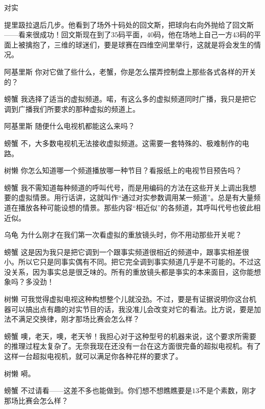 \begin{dialog}{对实}
\begin{dialogue}
提里趿拉退后几步。他看到了场外十码处的回文斯，把球向右向外抛给了回文斯——看来很成功！回文斯现在到了$35$码平面，$40$码，他在场地上自己一方$43$码的平面上被擒抱了，三维的球迷们，要是球赛在四维空间里举行，这就是将会发生的情况。

\item[阿基里斯]你对它做了些什么，老蟹，你是怎么摆弄控制盘上那些各式各样的开关的？

\item[螃蟹]我选择了适当的虚拟频道。喏，有这么多的虚拟频道同时广播，我只是把它调到广播我们所要求的那种虚拟的频道上。

\item[阿基里斯]随便什么电视机都能这么来吗？

\item[螃蟹]不，大多数电视机无法接收虚拟频道。这需要一套特殊的、极难制作的电路。

\item[树懒]你怎么知道哪一个频道播放哪一种节目？看报纸上的电视节目预告吗？

\item[螃蟹]我不需知道每种频道的呼叫代号，而是用编码的方法在这些开关上调出我想要的虚拟情景。用行话讲，这就叫作“通过对实参数调用某一频道”。总是有大量频道在播放各种可能设想的情景。那些内容“相近似”的各频道，其呼叫代号也彼此相近似。

\item[乌龟]为什么刚才在我们第一次看虚拟的重放镜头时，你不用动那些开关呢？

\item[螃蟹]这是因为我只是把它调到一个跟事实频道很相近的频道中，跟事实相差很小。所以它只是同事实偶有不同。把它完全调到事实频道几乎是不可能的。不过这没关系，因为事实总是很乏味的。所有的重放镜头都是亊实的本来面目，这你能想象吗？多没劲！

\item[树懒]可我觉得虚拟电视这种构想整个儿就没劲。不过，要是有证据说明你这台机器可以搞出点有趣的对实节目的话，我没准儿会改变对它的看法。比方说，要是加法不满足交换律，刚才那场比赛会怎么样？

\item[螃蟹]噢，老天，噢，老天爷！我担心对于这种型号的机器来说，这个要求所需要的推理过程太复杂了。无奈我现在还没有一台在这方面很完备的超拟电视机。有了这样一台超拟电视机，就可以满足你各种花样的要求了。

\item[树懒]嗬。

\item[螃蟹]不过请看——这差不多也能做到。你们想不想瞧瞧要是$13$不是个素数，刚才那场比赛会怎么样？


\end{dialogue}
\end{dialog}
